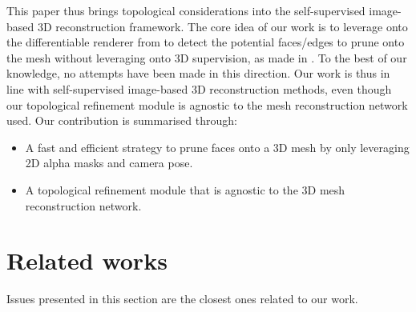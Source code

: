 This paper thus brings topological considerations into the self-supervised image-based 3D reconstruction framework. The core idea of our work is to leverage onto the differentiable renderer from \citep{ravi2020accelarating} to detect the potential faces/edges to prune onto the mesh without leveraging onto 3D supervision, as made in \citep{pan2019deep,nie2020total3dunderstanding,smith2019geometrics}. To the best of our knowledge, no attempts have been made in this direction. Our work is thus in line with self-supervised image-based 3D reconstruction methods, even though our topological refinement module is agnostic to the mesh reconstruction network used. Our contribution is summarised through: 
\begin{itemize}
    
    \item A fast and efficient strategy to prune faces onto a 3D mesh by only leveraging 2D alpha masks and camera pose. 

    \item A topological refinement module that is agnostic to the 3D mesh reconstruction network.
\end{itemize}

\section{Related works}
\label{sec:related_works}

Issues presented in this section are the closest ones related to our work. \newline 

